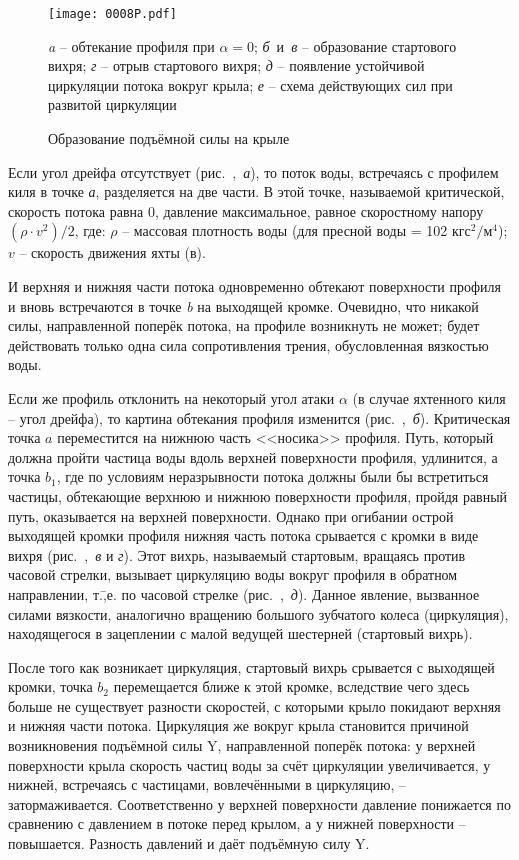 \begin{figure*}[!htb]
  \centering
  \texttt{[image: 0008P.pdf]}
  \caption{Образование подъёмной силы на крыле}
  \label{fig:8}
  \centering{}\small \textit{a} \--- обтекание профиля при $\alpha = 0$;
                     \textit{б}~и~\textit{в} \--- образование стартового вихря;
                     \textit{г} \--- отрыв стартового вихря;
                     \textit{д} \--- появление устойчивой циркуляции потока вокруг крыла;
                     \textit{е} \--- схема действующих сил при развитой циркуляции
\end{figure*}

Если угол дрейфа отсутствует (рис.~,~\textit{а}), то поток
воды, встречаясь с профилем киля в точке \textit{а}, разделяется на
две части. В этой точке, называемой критической, скорость потока равна
0, давление максимальное, равное скоростному напору
$(\rho \cdot v^2) / 2$, где: $\rho$ \--- массовая плотность воды (для
пресной воды = 102 $\text{кгс}^2 / \text{м}^4$); $v$ \--- скорость
движения яхты (в\speedms).

И верхняя и нижняя части потока одновременно обтекают поверхности
профиля и вновь встречаются в точке \textit{b} на выходящей
кромке. Очевидно, что никакой силы, направленной поперёк потока, на
профиле возникнуть не может; будет действовать только одна сила
сопротивления трения, обусловленная вязкостью воды.

Если же профиль отклонить на некоторый угол атаки $\alpha$ (в случае
яхтенного киля \--- угол дрейфа), то картина обтекания профиля
изменится (рис.~,~\textit{б}). Критическая точка $a$
переместится на нижнюю часть <<носика>> профиля. Путь, который должна
пройти частица воды вдоль верхней поверхности профиля, удлинится, а
точка $b_1$, где по условиям неразрывности потока должны были бы
встретиться частицы, обтекающие верхнюю и нижнюю поверхности профиля,
пройдя равный путь, оказывается на верхней поверхности. Однако при
огибании острой выходящей кромки профиля нижняя часть потока срывается
с кромки в виде вихря (рис.~,~\textit{в} и \textit{г}). Этот
вихрь, называемый стартовым, вращаясь против часовой стрелки, вызывает
циркуляцию воды вокруг профиля в обратном направлении, т.\=,е. по
часовой стрелке (рис.~,~\textit{д}). Данное явление, вызванное
силами вязкости, аналогично вращению большого зубчатого колеса
(циркуляция), находящегося в зацеплении с малой ведущей шестерней
(стартовый вихрь).

После того как возникает циркуляция, стартовый вихрь срывается с
выходящей кромки, точка $b_2$ перемещается ближе к этой кромке,
вследствие чего здесь больше не существует разности скоростей, с
которыми крыло покидают верхняя и нижняя части потока. Циркуляция же
вокруг крыла становится причиной возникновения подъёмной силы \ve Y,
направленной поперёк потока: у верхней поверхности крыла скорость
частиц воды за счёт циркуляции увеличивается, у нижней, встречаясь с
частицами, вовлечёнными в циркуляцию, \---
затормаживается. Соответственно у верхней поверхности давление
понижается по сравнению с давлением в потоке перед крылом, а у нижней
поверхности \--- повышается. Разность давлений и даёт подъёмную силу
\ve Y.


